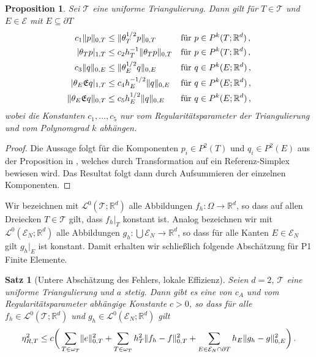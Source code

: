 \documentclass{scrartcl}
\newcounter{everything}
\newtheorem{proposition}[everything]{Proposition}
\newtheorem{theorem}[everything]{Satz}
\def\R{\mathbb{R}}
\newcommand{\cE}{\mathcal{E}}
\newcommand{\cL}{\mathcal{L}}
\newcommand{\cT}{\mathcal{T}}
\newcommand{\erw}{\mathfrak{E}}			%
\DeclarePairedDelimiter{\abs}{\lvert}{\rvert}
\DeclarePairedDelimiter{\norm}{\lVert}{\rVert}
\begin{document}
\begin{proposition}\label{pr:polynomielleAbschaetzungen}
Sei $\cT$ eine uniforme Triangulierung. Dann gilt für $T\in\cT$ und $E\in\cE$ mit $E\subseteq\partial T$
\begin{align}
	c_1\norm{p}_{0,T}&\leq \norm{\theta_T^{1/2}p}_{0,T} &&\text{für }p\in P^k(T;\R^d)\,, \label{eqn:thetaThalbabsch} \\
	\abs{\theta_Tp}_{1,T}&\leq c_2h_T^{-1}\norm{\theta_Tp}_{0,T} &&\text{für }p\in P^k(T;\R^d)\,, \label{eqn:thetaTgradabsch} \\
	c_3\norm{q}_{0,E}&\leq \norm{\theta_E^{1/2}q}_{0,E} &&\text{für }q\in P^k(E;\R^d)\,, \label{eqn:thetaEhalbabsch} \\
	\abs{\theta_E\erw q}_{1,T}&\leq c_4h_E^{-1/2}\norm{q}_{0,E} &&\text{für }q\in P^k(E;\R^d)\,, \label{eqn:thetaEgradabsch} \\
	\norm{\theta_E\erw q}_{0,T}&\leq c_5h_E^{1/2}\norm{q}_{0,E} &&\text{für }q\in P^k(E;\R^d)\,, \label{eqn:thetahalbEabsch}
\end{align}
wobei die Konstanten $c_1,\dots,c_5$ nur vom Regularitätsparameter der Triangulierung und vom Polynomgrad $k$ abhängen.
\end{proposition}
\begin{proof}
	Die Aussage folgt für die Komponenten $p_i\in P^2(T)$ und $q_i\in P^2(E)$ aus der Proposition in \cite[S.112]{Ver-2013}, welches durch Transformation auf ein Referenz-Simplex bewiesen wird. Das Resultat folgt dann durch Aufsummieren der einzelnen Komponenten.
\end{proof}
Wir bezeichnen mit $\cL^0(\cT;\R^d)$ alle Abbildungen $f_h\colon\Omega\to\R^d$, so dass auf allen Dreiecken $T\in\cT$ gilt, dass $f_h\big\vert_T$ konstant ist. Analog bezeichnen wir mit $\cL^0(\cE_N;\R^d)$ alle Abbildungen $g_h\colon\bigcup\cE_N\to\R^d$, so dass für alle Kanten $E\in\cE_N$ gilt $g_h\big\vert_E$ ist konstant. Damit erhalten wir schließlich folgende Abschätzung für P1 Finite Elemente.
\begin{theorem}[Untere Abschätzung des Fehlers, lokale Effizienz] \label{th:lokaleEffizienz}
	Seien $d=2$, $\cT$ eine uniforme Triangulierung und $a$ stetig. Dann gibt es eine von $c_A$ und vom Regularitätsparameter abhängige Konstante $c>0$, so dass für alle $f_h\in\cL^0(\cT;\R^d)$ und $g_h\in\cL^0(\cE_N;\R^d)$ gilt
	\begin{align*}
		\eta_{R,T}^2\leq c\bigg(\sum_{T\in\omega_T}\norm{e}_{0,T}^2+\sum_{T\in\omega_T}h_T^2\norm{f_h-f}_{0,T}^2+\sum_{E\in\cE_N\cap \partial T}h_E\norm{g_h-g}_{0,E}^2\bigg)\,.
	\end{align*}
\end{theorem}
\end{document}
